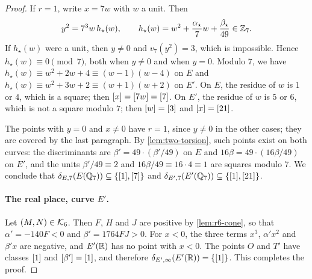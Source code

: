 \begin{proof}
If $r=1$, write $x=7w$ with $w$ a unit. Then
\[
y^2=7^3w\,h_\star(w),\qquad h_\star(w)=w^2+\frac{\alpha_\star}{7}w+\frac{\beta_\star}{49}\in\mathbb Z_7.
\]
If $h_\star(w)$ were a unit, then $y\ne0$ and $v_7(y^2)=3$, which is impossible. Hence $h_\star(w)\equiv0\pmod 7$, both when $y\ne0$ and when $y=0$. Modulo $7$, we have $h_\star(w)\equiv w^2+2w+4\equiv(w-1)(w-4)$ on $E$ and $h_\star(w)\equiv w^2+3w+2\equiv(w+1)(w+2)$ on $E'$. On $E$, the residue of $w$ is $1$ or $4$, which is a square; then $[x]=[7w]=[7]$. On $E'$, the residue of $w$ is $5$ or $6$, which is not a square modulo $7$; then $[w]=[3]$ and $[x]=[21]$.

The points with $y=0$ and $x\ne0$ have $r=1$, since $y\ne0$ in the other cases; they are covered by the last paragraph. By \cref{lem:two-torsion}, such points exist on both curves: the discriminants are $\beta'=49\cdot(\beta'/49)$ on $E$ and $16\beta=49\cdot(16\beta/49)$ on $E'$, and the units $\beta'/49\equiv2$ and $16\beta/49\equiv16\cdot4\equiv1$ are squares modulo $7$. We conclude that $\delta_{E,7}(E(\mathbb Q_7))\subseteq\{[1],[7]\}$ and $\delta_{E',7}(E'(\mathbb Q_7))\subseteq\{[1],[21]\}$.

\paragraph{The real place, curve $E'$.} Let $(M,N)\in\mathcal K_6$. Then $F$, $H$ and $J$ are positive by \cref{lem:r6-cone}, so that $\alpha'=-140F<0$ and $\beta'=1764FJ>0$. For $x<0$, the three terms $x^3$, $\alpha'x^2$ and $\beta'x$ are negative, and $E'(\mathbb R)$ has no point with $x<0$. The points $O$ and $T'$ have classes $[1]$ and $[\beta']=[1]$, and therefore $\delta_{E',\infty}(E'(\mathbb R))=\{[1]\}$. This completes the proof.
\end{proof}

